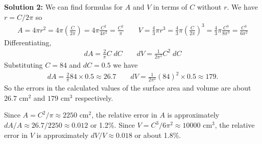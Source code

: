 \documentclass[12pt]{article}
\begin{document}
\begin{enumerate}
  \textbf{Solution 2:} We can find formulas for $A$ and $V$ in terms of $C$
  without $r$.  We have $r=C/2\pi$ so 
  \begin{align*}
    A = 4\pi r^2 = 4\pi \left(\frac{C}{2\pi}\right)
    = 4\pi \frac{C^2}{4\pi^2} = \frac{C^2}{\pi}
    \qquad
    V = \frac{4}{3} \pi r^3
    = \frac{4}{3} \pi \left(\frac{C}{2\pi}\right)^3
    = \frac{4}{3} \pi \frac{C^3}{8\pi^3}
    = \frac{C^3}{6\pi^2}
  \end{align*}
  Differentiating,
  \begin{align*}
    dA = \frac{2}{\pi} C \; dC
    \qquad
    dV = \frac{1}{2\pi^2} C^2 \; dC
  \end{align*}
  Substituting $C=84$ and $dC=0.5$ we have
  \begin{align*}
    dA = \frac{2}{\pi} 84\times 0.5 \approx 26.7
    \qquad
    dV = \frac{1}{2\pi^2} (84)^2 \times 0.5 \approx 179.
  \end{align*}
  So the errors in the calculated values of the surface area and volume are
  about $26.7$ cm$^2$ and $179$ cm$^3$ respectively.

  Since $A=C^2/\pi\approx 2250$ cm$^2$, 
  the relative error in $A$ is approximately
  $dA/A\approx 26.7/2250\approx 0.012$ or 1.2\%.
  Since $V=C^3/6\pi^2\approx 10000$ cm$^3$, the relative error in $V$
  is approximately $dV/V\approx 0.018$ or about 1.8\%.
\end{enumerate}
\end{document}
